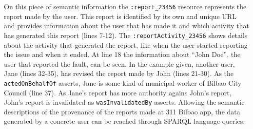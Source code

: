 On this piece of semantic information the \texttt{:report\_23456} resource represents the report made by the user. This report is identified by its own and unique URL and provides information about the user that has made it and which activity that has generated this report (lines 7-12). The \texttt{:reportActivity\_23456} shows details about the activity that generated the report, like when the user started reporting the issue and when it ended. At line 18 the information about ``John Doe'', the user that reported the fault, can be seen. In the example given, another user, Jane (lines 32-35), has revised the report made by John (lines 21-30). As the \texttt{actedOnBehalfOf} asserts, Jane is some kind of municipal worker of Bilbao City Council (line 37). As Jane's report has more authority agains John's report, John's report is invalidated as \texttt{wasInvalidatedBy} asserts. Allowing the semantic descriptions of the provenance of the reports made at 311 Bilbao app, the data generated by a concrete user can be reached through SPARQL \cite{prudhommeaux_sparql_2008} language queries.
